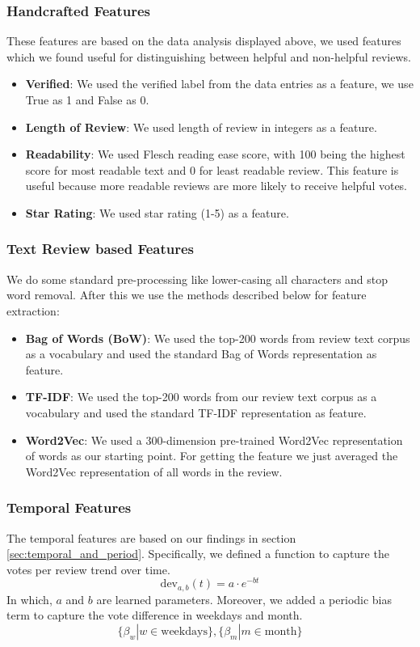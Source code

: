 \documentclass[final]{cvpr}
\begin{document}
\subsubsection{Handcrafted Features}
These features are based on the data analysis displayed above, we used features which we found useful for distinguishing between helpful and non-helpful reviews.
\begin{itemize}
    \item \textbf{Verified}: We used the verified label from the data entries as a feature, we use True as 1 and False as 0. 
    \item \textbf{Length of Review}: We used length of review in integers as a feature.
    \item \textbf{Readability}: We used Flesch reading ease score, with 100 being the highest score for most readable text and 0 for least readable review. This feature is useful because more readable reviews are more likely to receive helpful votes.
    \item \textbf{Star Rating}: We used star rating (1-5) as a feature.  
\end{itemize}

\subsubsection{Text Review based Features}
We do some standard pre-processing like lower-casing all characters and stop word removal. After this we use the methods described below for feature extraction:

\begin{itemize}
    \item \textbf{Bag of Words (BoW)}: We used the top-200 words from review text corpus as a vocabulary and used the standard Bag of Words representation as feature.
    \item \textbf{TF-IDF}: We used the top-200 words from our review text corpus as a vocabulary and used the standard TF-IDF representation as feature.
    \item \textbf{Word2Vec}: We used a 300-dimension pre-trained Word2Vec representation of words as our starting point. For getting the feature we just averaged the Word2Vec representation of all words in the review.
\end{itemize}

\subsubsection{Temporal Features}
The temporal features are based on our findings in section \ref{sec:temporal_and_period}.
Specifically, we defined a function to capture the votes per review trend over time.
$$\text{dev}_{a,b}(t) = a \cdot e ^{-bt}$$
In which, $a$ and $b$ are learned parameters.
Moreover, we added a periodic bias term to capture the vote difference in weekdays and month.
$$\{\beta_w | w \in \text{weekdays}\}, \{\beta_m | m \in \text{month}\}$$
\end{document}
